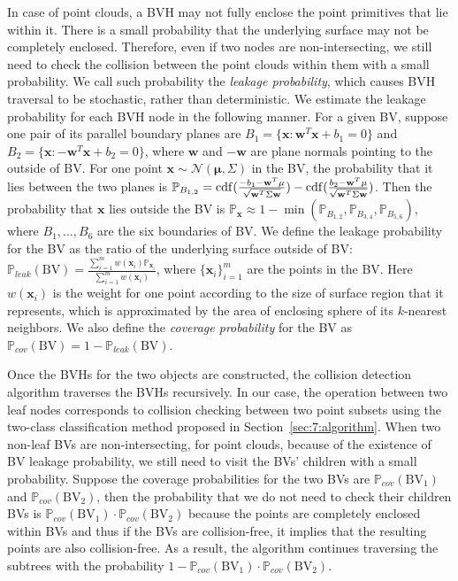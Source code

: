 In case of point clouds, a BVH may not fully enclose the point primitives that lie within it.
There is a small probability that the underlying surface may not be completely enclosed. Therefore, even if two nodes are non-intersecting, we still need to check the collision between the point clouds within them with a small probability. We call such probability the \emph{leakage probability},
which causes BVH traversal to be stochastic, rather than deterministic. We estimate the leakage probability for each BVH node in the following manner.
For a given BV, suppose one pair of its parallel boundary planes are $B_1 = \{\mathbf x: \mathbf w^T \mathbf x + b_1 = 0\}$ and $B_2 = \{\mathbf x: -\mathbf w^T \mathbf x + b_2 = 0\}$,
where $\mathbf w$ and $-\mathbf w$ are plane normals pointing to the outside of BV. For one point $\mathbf x \sim \mathcal{N}(\mathbf \mu, \Sigma)$ in the BV, the probability that it lies between
the two planes is $\mathbb{P}_{B_{1,2}} = \erf(\frac{-b_1 - \mathbf w^T \mu}{\sqrt{\mathbf w^T \Sigma \mathbf w}}) - \erf(\frac{b_2 - \mathbf w^T \mu}{\sqrt{\mathbf w^T \Sigma \mathbf w}})$.
Then the probability that $\mathbf x$ lies outside the BV
is $\mathbb{P}_{\mathbf x} \approx 1 - \min(\mathbb{P}_{B_{1,2}}, \mathbb{P}_{B_{3,4}}, \mathbb{P}_{B_{5,6}})$, where $B_1, ..., B_6$ are the six boundaries of BV. We define the
leakage probability for the BV as the ratio of the underlying surface outside of BV: $\mathbb{P}_{leak}(\text{BV}) = \frac{\sum_{i=1}^m w(\mathbf x_i) \mathbb{P}_{\mathbf x_i}}{\sum_{i=1}^m w(\mathbf x_i)}$, where $\{\mathbf x_i\}_{i=1}^m$ are the points in the BV.
Here $w(\mathbf x_i)$ is the weight for one point according to the size of surface region that it represents, which is approximated by the area of enclosing sphere of its $k$-nearest neighbors. We also define the {\em coverage probability} for the BV as $\mathbb{P}_{cov}(\text{BV}) = 1 - \mathbb{P}_{leak}(\text{BV})$.


Once the BVHs for the two objects are constructed, the collision detection algorithm traverses the BVHs recursively.
In our case, the operation between two leaf nodes corresponds to
collision checking between two point subsets using the two-class classification method proposed in Section~\ref{sec:7:algorithm}.
When two non-leaf BVs are non-intersecting, for point clouds, because of the existence of
BV leakage probability, we still need to visit the BVs' children with a small probability. Suppose the coverage probabilities for the two BVs are $\mathbb{P}_{cov}(\text{BV}_1)$ and $\mathbb{P}_{cov}(\text{BV}_2)$, then the probability that we do not need to check their children BVs
is $\mathbb{P}_{cov}(\text{BV}_1) \cdot \mathbb{P}_{cov}(\text{BV}_2)$ because the points are completely enclosed within BVs
and thus if the BVs are collision-free, it implies that the resulting points are also collision-free. As a result, the algorithm continues traversing the
subtrees with the probability $1 - \mathbb{P}_{cov}(\text{BV}_1) \cdot \mathbb{P}_{cov}(\text{BV}_2)$.


